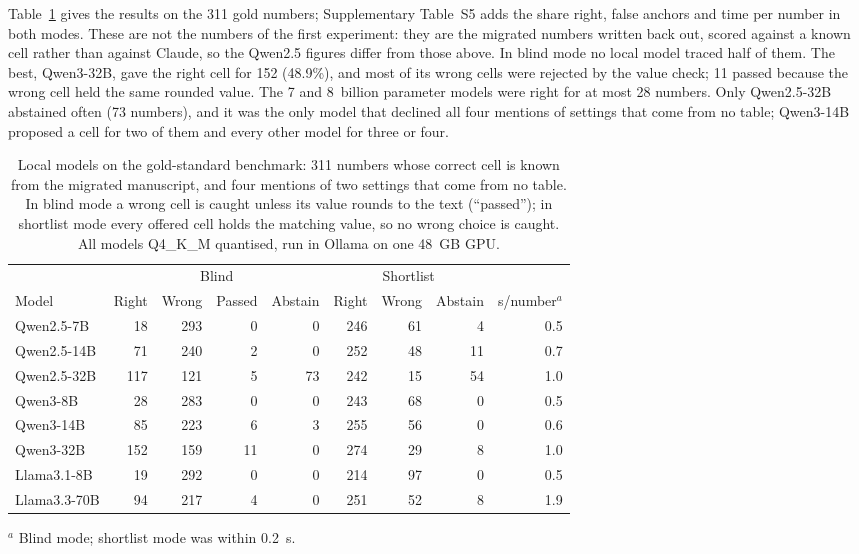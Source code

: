 Table~\ref{tab:bench} gives the results on the 311 gold numbers; Supplementary Table~S5 adds
the share right, false anchors and time per number in both modes. These are not the numbers of
the first experiment: they are the migrated numbers written back out, scored against a known
cell rather than against Claude, so the Qwen2.5 figures differ from those above. In blind mode no local model
traced half of them. The best, Qwen3-32B, gave the right cell for 152 (48.9\%), and most of its
wrong cells were rejected by the value check; 11 passed because the wrong cell held the same
rounded value. The 7 and 8~billion parameter models were right for at most 28 numbers. Only
Qwen2.5-32B abstained often (73 numbers), and it was the only model that declined all four
mentions of settings that come from no table; Qwen3-14B proposed a cell for two of them and every
other model for three or four.

\begin{table}[t]
\centering
\small
\caption{Local models on the gold-standard benchmark: 311 numbers whose correct cell is known
from the migrated manuscript, and four mentions of two settings that come from no table. In blind
mode a wrong cell is caught unless its value rounds to the text (``passed''); in shortlist mode
every offered cell holds the matching value, so no wrong choice is caught. All models Q4\_K\_M
quantised, run in Ollama on one 48~GB GPU.}
\label{tab:bench}
\begin{tabular}{lrrrrrrrr}
\toprule
& \multicolumn{4}{c}{Blind} & \multicolumn{3}{c}{Shortlist} & \\
\cmidrule(lr){2-5}\cmidrule(lr){6-8}
Model & Right & Wrong & Passed & Abstain & Right & Wrong & Abstain & s/number$^a$ \\
\midrule
Qwen2.5-7B   & 18  & 293 & 0  & 0  & 246 & 61 & 4  & 0.5 \\
Qwen2.5-14B  & 71  & 240 & 2  & 0  & 252 & 48 & 11 & 0.7 \\
Qwen2.5-32B  & 117 & 121 & 5  & 73 & 242 & 15 & 54 & 1.0 \\
Qwen3-8B     & 28  & 283 & 0  & 0  & 243 & 68 & 0  & 0.5 \\
Qwen3-14B    & 85  & 223 & 6  & 3  & 255 & 56 & 0  & 0.6 \\
Qwen3-32B    & 152 & 159 & 11 & 0  & 274 & 29 & 8  & 1.0 \\
Llama3.1-8B  & 19  & 292 & 0  & 0  & 214 & 97 & 0  & 0.5 \\
Llama3.3-70B & 94  & 217 & 4  & 0  & 251 & 52 & 8  & 1.9 \\
\bottomrule
\end{tabular}

\smallskip
{\footnotesize $^a$ Blind mode; shortlist mode was within 0.2~s.}
\end{table}

